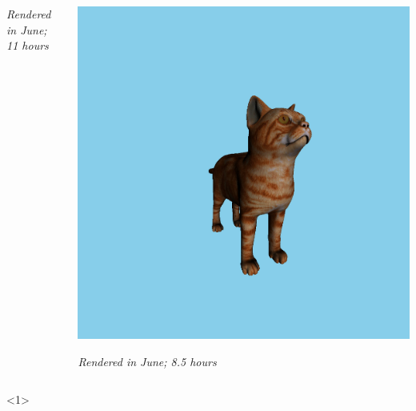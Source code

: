 \documentclass{beamer}
\begin{document}
\begin{frame}
{\begin{columns}[T]
\begin{column}{0.5\textwidth}
				\textit{Rendered in June; 11 hours}
			\end{column}
			\begin{column}{0.5\textwidth}
				\centering
				\includegraphics[width=\textwidth]{media/cat_sqr.jpg}
	
				\textit{Rendered in June; 8.5 hours}
			\end{column}
		\end{columns}
	}<1>
\end{frame}
\end{document}
